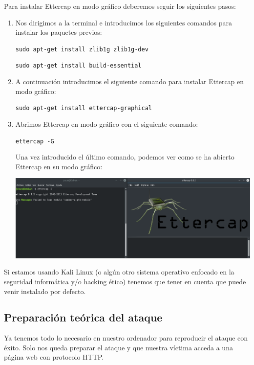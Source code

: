 Para instalar Ettercap en modo gráfico deberemos seguir los siguientes pasos:
\begin{enumerate}
	\item Nos dirigimos a la terminal e introducimos los siguientes comandos para instalar los paquetes previos:
	\begin{center}
		\texttt{sudo apt-get install zlib1g zlib1g-dev}
		
		\texttt{sudo apt-get install build-essential}
		
	\end{center}
	\item A continuación introducimos el siguiente comando para instalar Ettercap en modo gráfico:
	\begin{center}
		\texttt{sudo apt-get install ettercap-graphical}
		
	\end{center}
	\item Abrimos Ettercap en modo gráfico con el siguiente comando:
	\begin{center}
		\texttt{ettercap -G}
	\end{center}
	Una vez introducido el último comando, podemos ver como se ha abierto Ettercap en su modo gráfico:
	\begin{center}
		\includegraphics[scale=0.28]{Ettercap.png}
	\end{center}
\end{enumerate}

\Nota Si estamos usando Kali Linux (o algún otro sistema operativo enfocado en la seguridad informática y/o hacking ético) tenemos que tener en cuenta que puede venir instalado por defecto.

\subsection{Preparación teórica del ataque}
Ya tenemos todo lo necesario en nuestro ordenador para reproducir el ataque con éxito. Solo nos queda preparar el ataque y que nuestra víctima acceda a una página web con protocolo HTTP.

